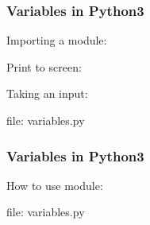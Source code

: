 \begin{frame}[fragile]
\frametitle{Variables in Python3}
Importing a module:


Print to screen:


Taking an input:


file: variables.py
\end{frame}

\begin{frame}[fragile]
\frametitle{Variables in Python3}
How to use module:


file: variables.py
\end{frame}